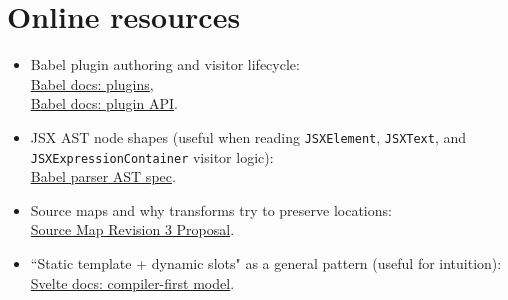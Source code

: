 \section{Online resources}

\begin{itemize}
\item Babel plugin authoring and visitor lifecycle:\\
\href{https://babeljs.io/docs/en/plugins}{Babel docs: plugins},\\
\href{https://babeljs.io/docs/en/babel-plugin-api}{Babel docs: plugin API}.

\item JSX AST node shapes (useful when reading \texttt{JSXElement}, \texttt{JSXText}, and \texttt{JSXExpressionContainer} visitor logic):\\
\href{https://github.com/babel/babel/blob/main/packages/babel-parser/ast/spec.md}{Babel parser AST spec}.

\item Source maps and why transforms try to preserve locations:\\
\href{https://sourcemaps.info/spec.html}{Source Map Revision 3 Proposal}.

\item ``Static template + dynamic slots" as a general pattern (useful for intuition):\\
\href{https://svelte.dev/docs/svelte/what-is-svelte}{Svelte docs: compiler-first model}.
\end{itemize}
